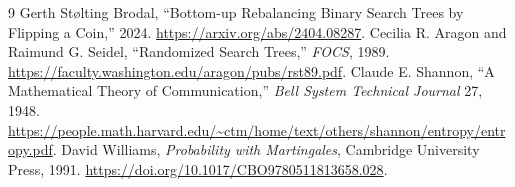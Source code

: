 \documentclass[11pt]{article}
\begin{document}
\begin{thebibliography}{9}
 Gerth St\o lting Brodal, ``Bottom-up Rebalancing Binary Search
Trees by Flipping a Coin,'' 2024. \url{https://arxiv.org/abs/2404.08287}.
 Cecilia R. Aragon and Raimund G. Seidel, ``Randomized Search
Trees,'' \emph{FOCS}, 1989. \url{https://faculty.washington.edu/aragon/pubs/rst89.pdf}.
 Claude E. Shannon, ``A Mathematical Theory of Communication,''
\emph{Bell System Technical Journal} 27, 1948.
\url{https://people.math.harvard.edu/~ctm/home/text/others/shannon/entropy/entropy.pdf}.
 David Williams, \emph{Probability with Martingales},
Cambridge University Press, 1991. \url{https://doi.org/10.1017/CBO9780511813658.028}.
\end{thebibliography}
\end{document}
